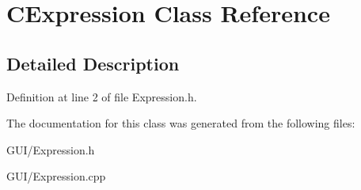 \hypertarget{class_c_expression}{}\section{C\+Expression Class Reference}
\label{class_c_expression}


\subsection{Detailed Description}


Definition at line 2 of file Expression.\+h.



The documentation for this class was generated from the following files\+:\begin{DoxyCompactItemize}
\item 
G\+U\+I/Expression.\+h\item 
G\+U\+I/Expression.\+cpp\end{DoxyCompactItemize}

